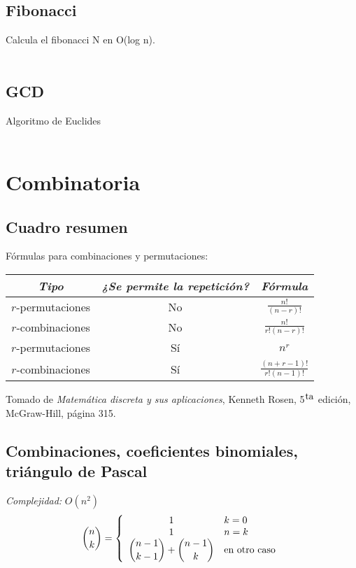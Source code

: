 \documentclass[10pt,letterpaper]{article}
\begin{document}
\subsection{Fibonacci}
Calcula el fibonacci N en O(log n).
\mbox{} \\
\mbox{} \\
\subsection{GCD}
Algoritmo de Euclides
\mbox{} \\
\mbox{} \\
\section{Combinatoria}
\subsection{Cuadro resumen}
Fórmulas para combinaciones y permutaciones:
\begin{center}
\renewcommand{\arraystretch}{2} %
\begin{tabular}{| c | c | c |}
\hline
\textit{Tipo} & \textit{¿Se permite la repetición?} & \textit{Fórmula} \\ [1.5ex]
\hline\hline

$r$-permutaciones & No & $ \displaystyle\frac{n!}{(n-r)!} $ \\ [1.5ex]
\hline
$r$-combinaciones & No & $ \displaystyle\frac{n!}{r!(n-r)!} $ \\  [1.5ex]
\hline
$r$-permutaciones & Sí & $ \displaystyle n^{r} $ \\
\hline
$r$-combinaciones & Sí & $ \displaystyle\frac{(n+r-1)!}{r!(n-1)!} $ \\ [1.5ex]
\hline
\end{tabular}
\renewcommand{\arraystretch}{1}
\end{center}
Tomado de \textit{Matemática discreta y sus aplicaciones}, Kenneth Rosen, 5${}^{\hbox{ta}}$ edición, McGraw-Hill, página 315.
\subsection{Combinaciones, coeficientes binomiales, triángulo de Pascal}
\emph{Complejidad:} $ O(n^2) $ \\
$$ {n \choose k} = \left\{
\begin{array}{c l}
 1 & k = 0\\
 1 & n = k\\
 \displaystyle {n - 1 \choose k - 1} + {n - 1 \choose k} & \mbox{en otro caso}\\
\end{array}
\right.
$$
\end{document}
